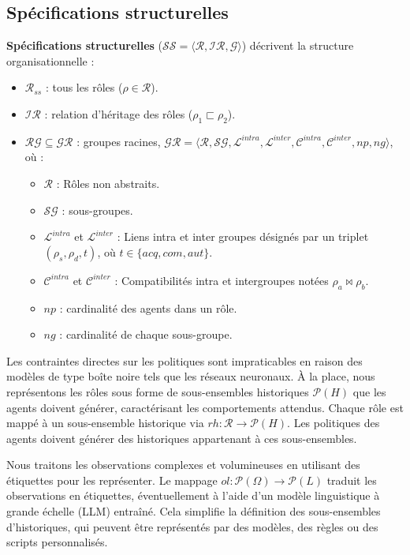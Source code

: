 \subsection{Spécifications structurelles}

\textbf{Spécifications structurelles} ($\mathcal{SS} = \langle \mathcal{R}, \mathcal{IR}, \mathcal{G} \rangle$) décrivent la structure organisationnelle :
\begin{itemize}
    \item $\mathcal{R}_{ss}$ : tous les rôles ($\rho \in \mathcal{R}$).
    \item $\mathcal{IR}$ : relation d'héritage des rôles ($\rho_1 \sqsubset \rho_2$).
    \item $\mathcal{RG} \subseteq \mathcal{GR}$ : groupes racines, $\mathcal{GR} = \langle \mathcal{R}, \mathcal{SG}, \mathcal{L}^{intra}, \mathcal{L}^{inter}, \mathcal{C}^{intra}, \mathcal{C}^{inter}, np, ng \rangle$, où :
          \begin{itemize}
              \item $\mathcal{R}$ : Rôles non abstraits.
              \item $\mathcal{SG}$ : sous-groupes.
              \item $\mathcal{L}^{intra}$ et $\mathcal{L}^{inter}$ : Liens intra et inter groupes désignés par un triplet $(\rho_s, \rho_d, t)$, où $t \in \{acq, com, aut\}$.
              \item $\mathcal{C}^{intra}$ et $\mathcal{C}^{inter}$ : Compatibilités intra et intergroupes notées $\rho_a \bowtie \rho_b$.
              \item $np$ : cardinalité des agents dans un rôle.
              \item $ng$ : cardinalité de chaque sous-groupe.
          \end{itemize}
\end{itemize}

Les contraintes directes sur les politiques sont impraticables en raison des modèles de type boîte noire tels que les réseaux neuronaux. À la place, nous représentons les rôles sous forme de sous-ensembles historiques $\mathcal{P}(H)$ que les agents doivent générer, caractérisant les comportements attendus. Chaque rôle est mappé à un sous-ensemble historique via $rh: \mathcal{R} \rightarrow \mathcal{P}(H)$. Les politiques des agents doivent générer des historiques appartenant à ces sous-ensembles.

Nous traitons les observations complexes et volumineuses en utilisant des étiquettes pour les représenter. Le mappage $ol: \mathcal{P}(\Omega) \rightarrow \mathcal{P}(L)$ traduit les observations en étiquettes, éventuellement à l'aide d'un modèle linguistique à grande échelle (LLM) entraîné. Cela simplifie la définition des sous-ensembles d'historiques, qui peuvent être représentés par des modèles, des règles ou des scripts personnalisés.

